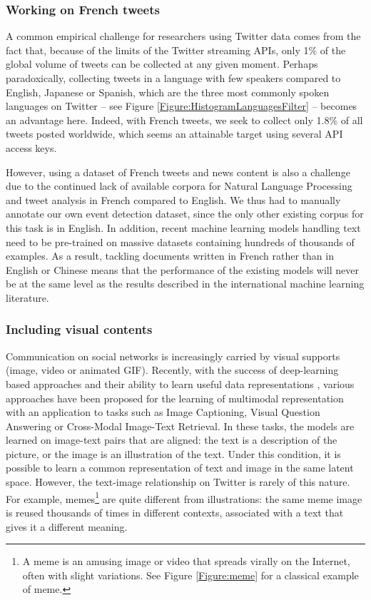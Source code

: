 \subsubsection{Working on French tweets}
A common empirical challenge for researchers
using Twitter data comes from the fact that, because of the limits of the Twitter streaming APIs, only 1\% of the global volume of tweets can be collected at any given moment. Perhaps paradoxically, collecting tweets in a language with few speakers compared to English, Japanese or Spanish, which are the three most commonly spoken languages on Twitter -- see Figure \ref{Figure:HistogramLanguagesFilter} -- becomes an advantage here. Indeed, with French tweets, we seek to collect only 1.8\% of all tweets posted worldwide, which seems an attainable target using several API access keys.

However, using a dataset of French tweets and news content is also a challenge due to the continued lack of available corpora for Natural Language Processing and tweet analysis in French compared to English. We thus had to manually annotate our own event detection dataset, since the only other existing corpus for this task is in English. In addition, recent machine learning models handling text need to be pre-trained on massive datasets containing hundreds of thousands of examples. As a result, tackling documents written in French rather than in English or Chinese means that the performance of the existing models will never be at the same level as the results described in the international machine learning literature.

\subsubsection{Including visual contents}
Communication on social networks is increasingly carried by visual supports (image, video or animated GIF). Recently, with the success of deep-learning based approaches and their ability to learn useful data representations \citep{bengio2013representation}, various approaches have been proposed for the learning of multimodal representation with an application to tasks such as Image Captioning, Visual Question Answering or Cross-Modal Image-Text Retrieval. In these tasks, the models are learned on image-text pairs that are aligned: the text is a description of the picture, or the image is an illustration of the text. Under this condition, it is possible to learn a common representation of text and image in the same latent space. However, the text-image relationship on Twitter is rarely of this nature. For example, memes\footnote{A meme is an amusing image or video that spreads virally on the Internet, often with slight variations. See Figure \ref{Figure:meme} for a classical example of meme.} are quite different from illustrations: the same meme image is reused thousands of times in different contexts, associated with a text that gives it a different meaning.

